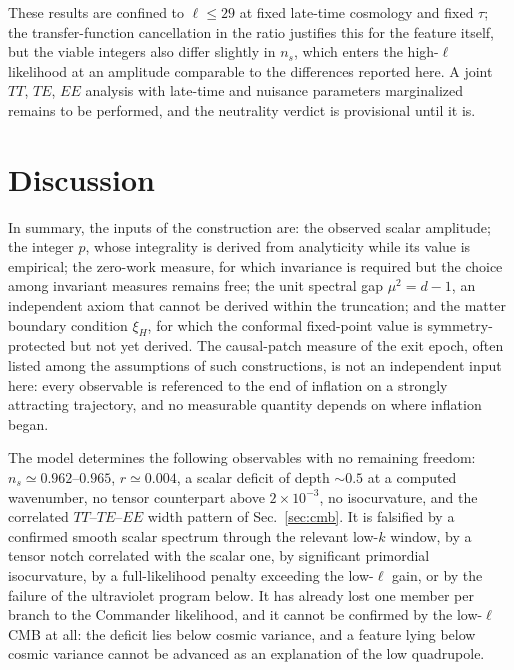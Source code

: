 \documentclass[aps,prd,twocolumn,superscriptaddress,nofootinbib,longbibliography]{revtex4-2}
\begin{document}
These results are confined to $\ell\le29$ at fixed late-time cosmology and
fixed $\tau$; the transfer-function cancellation in the ratio justifies this
for the feature itself, but the viable integers also differ slightly in
$n_s$, which enters the high-$\ell$ likelihood at an amplitude comparable to
the differences reported here. A joint $TT$, $TE$, $EE$ analysis with
late-time and nuisance parameters marginalized remains to be performed, and
the neutrality verdict is provisional until it is.

\section{Discussion}
\label{sec:discussion}
In summary, the inputs of the construction are: the observed scalar
amplitude; the integer $p$, whose integrality is derived from analyticity
while its value is empirical; the zero-work measure, for which invariance is
required but the choice among invariant measures remains free; the unit
spectral gap $\mu^2=d-1$, an independent axiom that cannot be derived within
the truncation; and the matter boundary condition $\xi_H$, for which the
conformal fixed-point value is symmetry-protected but not yet derived. The
causal-patch measure of the exit epoch, often listed among the assumptions
of such constructions, is not an independent input here: every observable
is referenced to the end of inflation on a strongly
attracting trajectory, and no measurable quantity depends on where inflation
began.

The model determines the following observables with no remaining freedom:
$n_s\simeq0.962$--$0.965$, $r\simeq0.004$, a scalar deficit of depth
$\sim0.5$ at a computed wavenumber, no tensor counterpart above
$2\times10^{-3}$, no isocurvature, and the correlated
$TT$--$TE$--$EE$ width pattern of Sec.~\ref{sec:cmb}. It is falsified by a
confirmed smooth scalar spectrum through the relevant low-$k$ window, by a
tensor notch correlated with the scalar one, by significant primordial
isocurvature, by a full-likelihood penalty exceeding the low-$\ell$ gain, or
by the failure of the ultraviolet program below. It has already lost one
member per branch to the Commander likelihood, and it cannot be confirmed by
the low-$\ell$ CMB at all: the deficit lies below cosmic variance, and a
feature lying below cosmic variance cannot be advanced as an explanation of
the low quadrupole.
\end{document}
